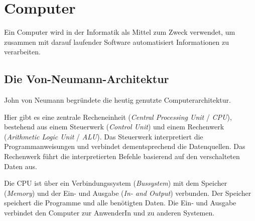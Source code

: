\documentclass{article}
\begin{document}
\section{Computer}
\label{sec:informatik_computer_hardware}
Ein Computer wird in der Informatik als Mittel zum Zweck verwendet, um zusammen mit darauf laufender Software automatisiert Informationen zu verarbeiten.

\subsection{Die Von-Neumann-Architektur}
John von Neumann begründete die heutig genutzte Computerarchitektur. 

Hier gibt es eine zentrale Recheneinheit (\emph{Central Processing Unit} / \emph{CPU}), bestehend aus einem Steuerwerk (\emph{Control Unit}) und einem Rechenwerk (\emph{Arithmetic Logic Unit} / \emph{ALU}). Das Steuerwerk interpretiert die Programmanweisungen und verbindet dementsprechend die Datenquellen. Das Rechenwerk führt die interpretierten Befehle basierend auf den verschalteten Daten aus.

Die CPU ist über ein Verbindungssystem (\emph{Bussystem}) mit dem Speicher (\emph{Memory}) und der Ein- und Ausgabe (\emph{In- and Output}) verbunden. Der Speicher speichert die Programme und alle benötigten Daten. Die Ein- und Ausgabe verbindet den Computer zur AnwenderIn und zu anderen Systemen.

\end{document}

